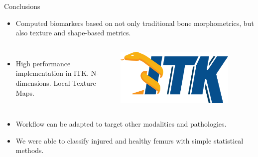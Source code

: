 \documentclass[10pt,aspectratio=169]{beamer}
\begin{document}
\begin{frame}{Conclusions}
  \begin{itemize} \itemsep1.0em

    \item Computed biomarkers based on not only traditional bone morphometrics, but also texture and shape-based metrics.
  \end{itemize}

  \begin{columns}[onlytextwidth]
    \begin{itemize} \itemsep1.0em
      \item High performance implementation in ITK. N-dimensions. Local Texture Maps.
    \end{itemize}
    \centering
    \includegraphics[width=0.8\textwidth]{./logos/logo_ITK.png}
  \end{columns}

  \begin{itemize} \itemsep1.0em
    \item Workflow can be adapted to target other modalities and pathologies.
    \item We were able to classify injured and healthy femurs with simple statistical methods.
  \end{itemize}
\end{frame}
\end{document}
